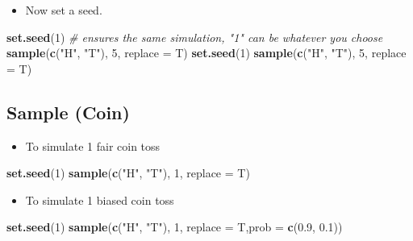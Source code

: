 \documentclass[]{article}
\newenvironment{Shaded}{\begin{snugshade}}{\end{snugshade}}
\newcommand{\CommentTok}[1]{\textcolor[rgb]{0.56,0.35,0.01}{\textit{#1}}}
\newcommand{\DataTypeTok}[1]{\textcolor[rgb]{0.13,0.29,0.53}{#1}}
\newcommand{\DecValTok}[1]{\textcolor[rgb]{0.00,0.00,0.81}{#1}}
\newcommand{\FloatTok}[1]{\textcolor[rgb]{0.00,0.00,0.81}{#1}}
\newcommand{\KeywordTok}[1]{\textcolor[rgb]{0.13,0.29,0.53}{\textbf{#1}}}
\newcommand{\NormalTok}[1]{#1}
\newcommand{\StringTok}[1]{\textcolor[rgb]{0.31,0.60,0.02}{#1}}
\providecommand{\tightlist}{%
  \setlength{\itemsep}{0pt}\setlength{\parskip}{0pt}}
\begin{document}
\begin{itemize}
\tightlist
\item
  Now set a seed.
\end{itemize}

\begin{Shaded}
\begin{Highlighting}[]
\KeywordTok{set.seed}\NormalTok{(}\DecValTok{1}\NormalTok{)  }\CommentTok{# ensures the same simulation, "1" can be whatever you choose}
\KeywordTok{sample}\NormalTok{(}\KeywordTok{c}\NormalTok{(}\StringTok{"H"}\NormalTok{, }\StringTok{"T"}\NormalTok{), }\DecValTok{5}\NormalTok{, }\DataTypeTok{replace =}\NormalTok{ T)}
\KeywordTok{set.seed}\NormalTok{(}\DecValTok{1}\NormalTok{)}
\KeywordTok{sample}\NormalTok{(}\KeywordTok{c}\NormalTok{(}\StringTok{"H"}\NormalTok{, }\StringTok{"T"}\NormalTok{), }\DecValTok{5}\NormalTok{, }\DataTypeTok{replace =}\NormalTok{ T)}
\end{Highlighting}
\end{Shaded}

\hypertarget{sample-coin}{%
\subsection{Sample (Coin)}\label{sample-coin}}

\begin{itemize}
\tightlist
\item
  To simulate 1 fair coin toss
\end{itemize}

\begin{Shaded}
\begin{Highlighting}[]
\KeywordTok{set.seed}\NormalTok{(}\DecValTok{1}\NormalTok{) }
\KeywordTok{sample}\NormalTok{(}\KeywordTok{c}\NormalTok{(}\StringTok{"H"}\NormalTok{, }\StringTok{"T"}\NormalTok{), }\DecValTok{1}\NormalTok{, }\DataTypeTok{replace =}\NormalTok{ T)}
\end{Highlighting}
\end{Shaded}

\begin{itemize}
\tightlist
\item
  To simulate 1 biased coin toss
\end{itemize}

\begin{Shaded}
\begin{Highlighting}[]
\KeywordTok{set.seed}\NormalTok{(}\DecValTok{1}\NormalTok{)}
\KeywordTok{sample}\NormalTok{(}\KeywordTok{c}\NormalTok{(}\StringTok{"H"}\NormalTok{, }\StringTok{"T"}\NormalTok{), }\DecValTok{1}\NormalTok{, }\DataTypeTok{replace =}\NormalTok{ T,}\DataTypeTok{prob =} \KeywordTok{c}\NormalTok{(}\FloatTok{0.9}\NormalTok{, }\FloatTok{0.1}\NormalTok{))}
\end{Highlighting}
\end{Shaded}
\end{document}
